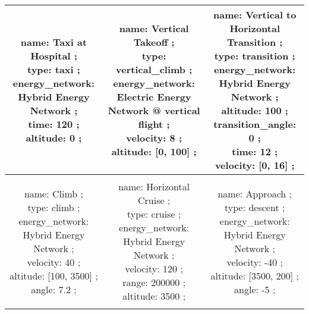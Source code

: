  \begin{table}[h] 
 \begin{adjustbox}{width=1\textwidth} 
 \begin{tabular}{|c|c|c|}
 \hline 

\makecell{name: Taxi at Hospital ; \\ type: taxi ; \\ energy\_network: Hybrid Energy Network ; \\ time: 120 ; \\ altitude: 0 ; \\ } & \makecell{name: Vertical Takeoff ; \\ type: vertical\_climb ; \\ energy\_network: Electric Energy Network @ vertical flight ; \\ velocity: 8 ; \\ altitude: [0, 100] ; \\ } & \makecell{name: Vertical to Horizontal Transition ; \\ type: transition ; \\ energy\_network: Hybrid Energy Network ; \\ altitude: 100 ; \\ transition\_angle: 0 ; \\ time: 12 ; \\ velocity: [0, 16] ; \\ }\\ \hline \\ 
\makecell{name: Climb ; \\ type: climb ; \\ energy\_network: Hybrid Energy Network ; \\ velocity: 40 ; \\ altitude: [100, 3500] ; \\ angle: 7.2 ; \\ } & \makecell{name: Horizontal Cruise ; \\ type: cruise ; \\ energy\_network: Hybrid Energy Network ; \\ velocity: 120 ; \\ range: 200000 ; \\ altitude: 3500 ; \\ } & \makecell{name: Approach ; \\ type: descent ; \\ energy\_network: Hybrid Energy Network ; \\ velocity: -40 ; \\ altitude: [3500, 200] ; \\ angle: -5 ; \\ }\\ \hline \\ 

\end{tabular}
\end{adjustbox}
\end{table}
